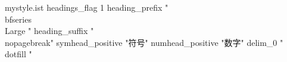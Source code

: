 \ifUseBiblatex
  \usepackage{csquotes}
  \usepackage[
    backend=biber,
    style=ieee,       %
    sorting=none,     %
    doi=false,        %
    isbn=false,       %
    url=false         %
  ]{biblatex}
  
\fi

\ifUseGlossaries
  \usepackage[acronym,toc]{glossaries}
  \makeglossaries
  
\fi

\newif\ifUseIndex \UseIndextrue %

\ifUseIndex
  \usepackage{imakeidx}

  \begin{filecontents*}{mystyle.ist}
    headings_flag 1
    heading_prefix "{\\bfseries\\Large "
    heading_suffix "}\\nopagebreak"  %
    symhead_positive "符号"
    numhead_positive "数字"
    delim_0 "\\dotfill "
  \end{filecontents*}

  \makeindex[intoc, options=-s mystyle.ist, title=索引, noautomatic]
\fi

\ifUseTodo
  \setlength{\marginparwidth}{2cm}
  \usepackage[colorinlistoftodos]{todonotes}
\else
  \setlength{\marginparwidth}{2cm}
  \usepackage[disable]{todonotes}
\fi

\ifUseWatermark
  \usepackage{xcolor}
  \usepackage{background}
\fi
